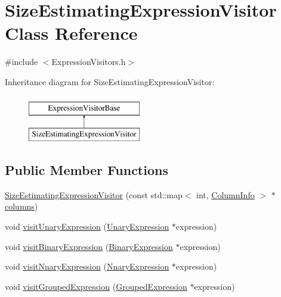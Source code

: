 \hypertarget{class_size_estimating_expression_visitor}{\section{Size\+Estimating\+Expression\+Visitor Class Reference}
\label{class_size_estimating_expression_visitor}
}


{\ttfamily \#include $<$Expression\+Visitors.\+h$>$}

Inheritance diagram for Size\+Estimating\+Expression\+Visitor\+:\begin{figure}[H]
\begin{center}
\leavevmode
\includegraphics[height=2.000000cm]{class_size_estimating_expression_visitor}
\end{center}
\end{figure}
\subsection*{Public Member Functions}
\begin{DoxyCompactItemize}
\item 
\hyperlink{class_size_estimating_expression_visitor_a161843e94155226df99a16ab2227a024}{Size\+Estimating\+Expression\+Visitor} (const std\+::map$<$ int, \hyperlink{class_column_info}{Column\+Info} $>$ $\ast$\hyperlink{class_size_estimating_expression_visitor_ac3830138167760ff403ad52bd606a560}{columns})
\item 
void \hyperlink{class_size_estimating_expression_visitor_a6cbd26f2d5997577bd7f18d68f1cf866}{visit\+Unary\+Expression} (\hyperlink{class_unary_expression}{Unary\+Expression} $\ast$expression)
\item 
void \hyperlink{class_size_estimating_expression_visitor_a40a902ac926af0d18d976769abda5af3}{visit\+Binary\+Expression} (\hyperlink{class_binary_expression}{Binary\+Expression} $\ast$expression)
\item 
void \hyperlink{class_size_estimating_expression_visitor_a1eeaaf34393c7c79fd4079bf8ea97bc9}{visit\+Nnary\+Expression} (\hyperlink{class_nnary_expression}{Nnary\+Expression} $\ast$expression)
\item 
void \hyperlink{class_size_estimating_expression_visitor_a8015f22031b44cbe54579f92b7e9cc00}{visit\+Grouped\+Expression} (\hyperlink{class_grouped_expression}{Grouped\+Expression} $\ast$expression)
\end{DoxyCompactItemize}
